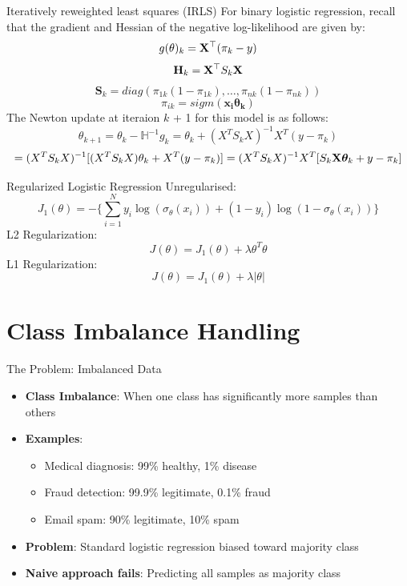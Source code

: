 \documentclass{beamer}
\begin{document}
\begin{frame}{Iteratively reweighted least squares (IRLS)}
For binary logistic regression, recall that the gradient and Hessian of the negative log-likelihood are given by:
\[
g(\theta)_{k} = \mathbf{X}^\top(\pi_{k} - y)
\]
\[
\mathbf{H}_k = \mathbf{X}^\top S_k \mathbf{X}
\]
\[
\mathbf{S}_{k} = diag(\pi_{1k}(1 - \pi_{1k}), \ldots, \pi_{nk}(1 - \pi_{nk}))
\]
\[
\pi_{ik} = sigm(\mathbf{x_{i}\theta_{k}})
\]
The Newton update at iteraion $k$ + 1 for this model is as follows:
\[
\theta_{k+1} = \theta_{k} - \mathbb{H}^{-1}g_{k} = \theta_{k} + (X^{T}S_{k}X)^{-1}X^{T}(y - \pi_{k})
\]
\[
= (X^{T}S_{k}X)^{-1}[(X^{T}S_{k}X)\theta_{k} + X^{T}(y - \pi_{k})] = (X^{T}S_{k}X)^{-1}X^{T}[S_{k}\mathbf{X}\boldsymbol{\theta}_{k} + y - \pi_{k}]
\]
\end{frame}
\begin{frame}{Regularized Logistic Regression}
Unregularised:
\begin{equation*}
J_{1}(\theta) = -\bigg\{\sum_{i=1}^{N}y_{i}\log(\sigma_{\theta}(x_{i})) + (1 - y_{i})\log(1 - \sigma_{\theta}(x_{i}))\bigg\}
\end{equation*}
L2 Regularization:
\begin{equation*}
J(\theta) = J_{1}(\theta) + \lambda\theta^{T}\theta
\end{equation*}
L1 Regularization:
\begin{equation*}
J(\theta) = J_{1}(\theta) + \lambda|\theta|
\end{equation*}
\end{frame}

\section{Class Imbalance Handling}

\begin{frame}{The Problem: Imbalanced Data}
\begin{itemize}[<+->]
\item \textbf{Class Imbalance}: When one class has significantly more samples than others
\item \textbf{Examples}:
    \begin{itemize}
    \item Medical diagnosis: 99\% healthy, 1\% disease
    \item Fraud detection: 99.9\% legitimate, 0.1\% fraud
    \item Email spam: 90\% legitimate, 10\% spam
    \end{itemize}
\item \textbf{Problem}: Standard logistic regression biased toward majority class
\item \textbf{Naive approach fails}: Predicting all samples as majority class
\end{itemize}
\end{frame}
\end{document}
